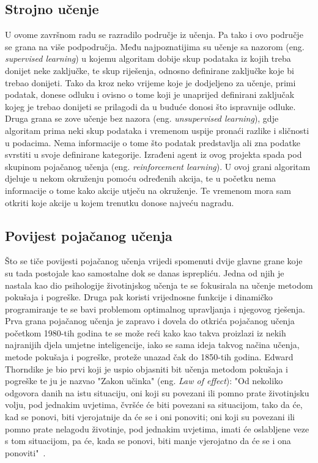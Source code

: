 \subsection{Strojno učenje}
U ovome završnom radu se razradilo područje iz učenja. Pa tako i ovo područje se grana na više podpodručja. Među najpoznatijima su učenje sa nazorom (eng. \textit{supervised learning}) u kojemu algoritam dobije skup podataka iz kojih treba donijet neke zaključke, te skup riješenja, odnosno definirane zaključke koje bi trebao donijeti. Tako da kroz neko vrijeme koje je dodjeljeno za učenje, primi podatak, donese odluku i ovisno 
o tome koji je unaprijed definirani zaključak kojeg je trebao donijeti se prilagodi da u buduće donosi što ispravnije odluke. Druga grana se zove učenje bez nazora (eng. \textit{unsupervised learning}), gdje algoritam prima neki skup podataka i vremenom uspije pronaći razlike i sličnosti u podacima. Nema informacije o tome što podatak predstavlja ali zna podatke svrstiti u svoje definirane kategorije. Izrađeni agent iz ovog projekta spada pod skupinom pojačanog učenja (eng. \textit{reinforcement learning}). U ovoj grani algoritam djeluje u nekom okruženju pomoću određenih akcija, te u početku nema informacije o tome kako akcije utječu na okruženje. Te vremenom mora sam otkriti koje akcije u kojem trenutku donose najveću nagradu.


\subsection{Povijest pojačanog učenja}
Što se tiče povijesti pojačanog učenja vrijedi spomenuti dvije glavne grane koje su tada postojale kao samostalne dok se danas isprepliću. Jedna od njih je nastala kao dio psihologije životinjskog učenja te se fokusirala na učenje metodom pokušaja i pogreške. Druga pak koristi vrijednosne funkcije i dinamičko programiranje te se bavi problemom optimalnog upravljanja i njegovog rješenja. Prva grana pojačanog učenja je zapravo i dovela do otkrića pojačanog učenja početkom 1980-tih godina te se može reći kako kao takva proizlazi iz nekih najranijih djela umjetne inteligencije, iako se sama ideja takvog načina učenja, metode pokušaja i pogreške, proteže unazad čak do 1850-tih godina. Edward Thorndike je bio prvi koji je uspio objasniti bit učenja metodom pokušaja i pogreške te ju je nazvao "Zakon učinka" (eng. \textit{Law of effect}): "Od nekoliko odgovora danih na istu situaciju, oni koji su povezani ili pomno prate životinjsku volju, pod jednakim uvjetima, čvršće će biti povezani sa situacijom, tako da će, kad se ponovi, biti vjerojatnije da će se i oni ponoviti; oni koji su povezani ili pomno prate nelagodu životinje, pod jednakim uvjetima, imati će oslabljene veze s tom situacijom, pa će, kada se ponovi, biti manje vjerojatno da će se i ona ponoviti"~\cite{reinforcement_learning}.

